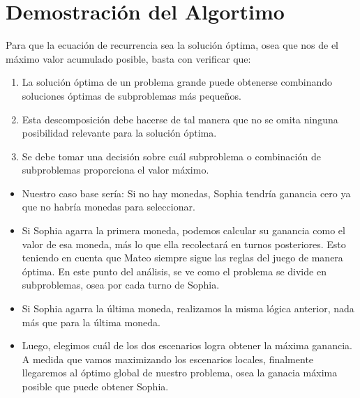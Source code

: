 \section{Demostración del Algortimo}

Para que la ecuación de recurrencia sea la solución óptima, osea que nos de el máximo valor acumulado posible, basta con verificar que:

\begin{enumerate}
    \item La solución óptima de un problema grande puede obtenerse combinando soluciones óptimas de subproblemas más pequeños.
    \item Esta descomposición debe hacerse de tal manera que no se omita ninguna posibilidad relevante para la solución óptima.
    \item Se debe tomar una decisión sobre cuál subproblema o combinación de subproblemas proporciona el valor máximo.
\end{enumerate}



\begin{itemize}
    \item Nuestro caso base sería: Si no hay monedas, Sophia tendría ganancia cero ya que no habría monedas para seleccionar.
    \item Si Sophia agarra la primera moneda, podemos calcular su ganancia como el valor de esa moneda, más lo que ella recolectará en turnos posteriores. Esto teniendo en cuenta
    que Mateo siempre sigue las reglas del juego de manera óptima. En este punto del análisis, se ve como el problema se divide en subproblemas, osea por cada turno de Sophia.
    \item Si Sophia agarra la última moneda, realizamos la misma lógica anterior, nada más que para la última moneda.
    \item Luego, elegimos cuál de los dos escenarios logra obtener la máxima ganancia. A medida que vamos maximizando los escenarios locales, finalmente llegaremos al óptimo global de nuestro problema, osea la ganacia máxima posible que puede obtener Sophia.
    \end{itemize}